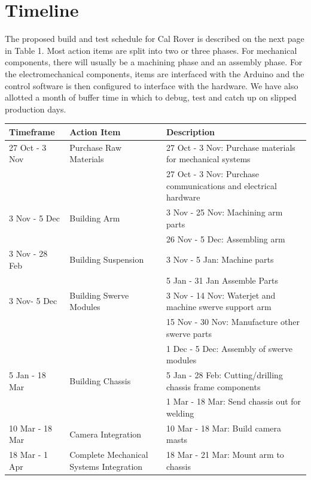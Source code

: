 \documentclass[titlepage,twocolumn,10pt]{article}
\begin{document}
    \section{Timeline}
    The proposed build and test schedule for Cal Rover is described on the next page in Table 1. Most action items are split into two or three phases. For mechanical components, there will usually be a machining phase and an assembly phase. For the electromechanical components, items are interfaced with the Arduino and the control software is then configured to interface with the hardware. We have also allotted a month of buffer time in which to debug, test and catch up on slipped production days.

    \begin{table}[P]
        \begin{tabular*}{\textwidth}{l  l  l}
            \textbf{Timeframe} & \textbf{Action Item} & \textbf{Description} \\
            \hline \hline
            27 Oct - 3 Nov & Purchase Raw Materials & 27 Oct - 3 Nov: Purchase materials for mechanical systems \\
            & & 27 Oct - 3 Nov: Purchase communications and electrical hardware\\
            \hline
            3 Nov - 5 Dec & Building Arm & 3 Nov - 25 Nov: Machining arm parts\\
            & & 26 Nov - 5 Dec: Assembling arm\\
            \hline
            3 Nov - 28 Feb & Building Suspension & 3 Nov -  5 Jan: Machine parts\\
            & & 5 Jan - 31 Jan Assemble Parts\\
            \hline
            3 Nov- 5 Dec & Building Swerve Modules & 3 Nov - 14 Nov: Waterjet and machine swerve support arm \\
            & & 15 Nov - 30 Nov: Manufacture other swerve parts\\
            & & 1 Dec - 5 Dec: Assembly of swerve modules\\
            \hline
            5 Jan - 18 Mar & Building Chassis & 5  Jan - 28 Feb: Cutting/drilling chassis frame components \\
            & & 1 Mar - 18 Mar: Send chassis out for welding \\
            \hline
            10 Mar - 18 Mar & Camera Integration &  10 Mar - 18 Mar: Build camera masts \\
            \hline
            18 Mar - 1 Apr & Complete Mechanical Systems Integration & 18 Mar - 21 Mar: Mount arm to chassis \\

\end{tabular*}
\end{table}
\end{document}
